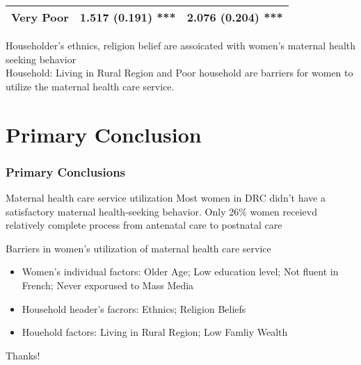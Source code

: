\documentclass[13pt]{beamer}
\renewcommand{\footnotesize}{\scriptsize}
\renewcommand{\footnotesize}{\fontsize{9pt}{12pt}\selectfont}
\renewcommand{\footnotesize}{\tiny}
\begin{document}
\begin{frame}
\begin{table}[]
{\begin{tabular}{@{}lcc@{}}
	{\color[HTML]{FE0000} Very Poor}                                                                                                                 & {\color[HTML]{FE0000} 1.517 (0.191) ***}                                                                               & {\color[HTML]{FE0000} 2.076 (0.204) ***}                                                                             \\ \bottomrule
\end{tabular}
	}
	\end{table}
	\footnotesize Householder's ethnics, religion belief are assoicated with women's maternal health seeking behavior\\
	Household: Living in Rural Region and Poor household are barriers for women to utilize the maternal health care service.
\end{frame}
\section{Primary Conclusion}
	\begin{frame}
	\frametitle{Primary Conclusions}
	\begin{block}{Maternal health care service utilization}
		{
		Most women in DRC didn't have a satisfactory maternal health-seeking behavior. Only 26\% women receievd relatively complete process from antenatal care to postnatal care 
		}
	\end{block}
	\begin{exampleblock}{Barriers in women's utilization of maternal health care service}
		{
			\begin{itemize}
				\item Women's individual factors: Older Age; Low education level; Not fluent in French; Never exporused to Mass Media
				\item Household header's facrors: Ethnics; Religion Beliefs
				\item Houehold factors: Living in Rural Region; Low Famliy Wealth
			\end{itemize}
		}
	\end{exampleblock}
	\end{frame}  
\begin{frame}
	\centering
	{\huge Thanks!}
\end{frame}
\end{document}
